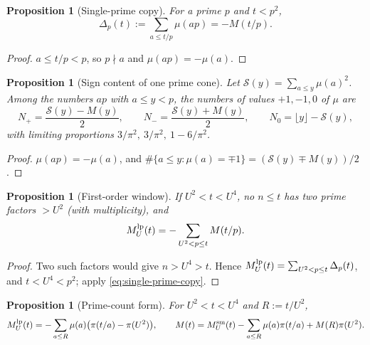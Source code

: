 \documentclass[11pt]{amsart}
\numberwithin{equation}{section}
\theoremstyle{plain}
\newtheorem{proposition}[theorem]{Proposition}
\theoremstyle{definition}
\theoremstyle{remark}
\newcommand{\Sq}{\mathcal{S}}
\begin{document}
\begin{proposition}[Single-prime copy]
\label{prop:single_prime_copy}
For a prime $p$ and $t<p^2$,
\begin{equation}
\label{eq:single-prime-copy}
  \Delta_p(t):=\sum_{a\le t/p}\mu(ap)=-M(t/p).
\end{equation}
\end{proposition}

\begin{proof}
$a\le t/p<p$, so $p\nmid a$ and $\mu(ap)=-\mu(a)$.
\end{proof}

\begin{proposition}[Sign content of one prime cone]
\label{prop:prime-cone-signs}
Let $\Sq(y)=\sum_{a\le y}\mu(a)^2$. Among the numbers $ap$ with $a\le y<p$,
the numbers of values $+1,-1,0$ of $\mu$ are
\begin{equation}
\label{eq:cone_counts}
  N_+=\frac{\Sq(y)-M(y)}{2},\qquad N_-=\frac{\Sq(y)+M(y)}{2},\qquad
  N_0=\lfloor y\rfloor-\Sq(y),
\end{equation}
with limiting proportions $3/\pi^2,\ 3/\pi^2,\ 1-6/\pi^2$.
\end{proposition}

\begin{proof}
$\mu(ap)=-\mu(a)$, and $\#\{a\le y:\mu(a)=\mp1\}=(\Sq(y)\mp M(y))/2$.
\end{proof}

\begin{proposition}[First-order window]
\label{prop:linear-new-primes}
If $U^2<t<U^4$, no $n\le t$ has two prime factors $>U^2$ (with
multiplicity), and
\begin{equation}
\label{eq:first-order-total}
  M^{\rm lp}_U(t)=-\sum_{U^2<p\le t}M(t/p).
\end{equation}
\end{proposition}

\begin{proof}
Two such factors would give $n>U^4>t$. Hence $M^{\rm lp}_U(t)=\sum_{U^2<p\le t}
\Delta_p(t)$, and $t<U^4<p^2$; apply \eqref{eq:single-prime-copy}.
\end{proof}

\begin{proposition}[Prime-count form]
\label{prop:prime_count_form}
For $U^2<t<U^4$ and $R:=t/U^2$,
\begin{equation}
\label{eq:prime_count_form}
  M^{\rm lp}_U(t)=-\sum_{a\le R}\mu(a)\bigl(\pi(t/a)-\pi(U^2)\bigr),
  \qquad
  M(t)=M^{\rm sm}_U(t)-\sum_{a\le R}\mu(a)\pi(t/a)+M(R)\pi(U^2).
\end{equation}
\end{proposition}
\end{document}
